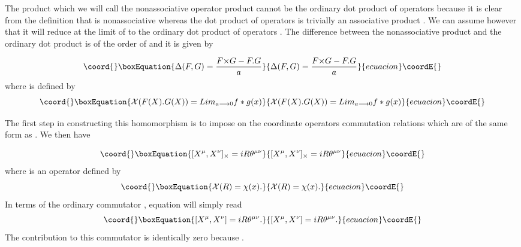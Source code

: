 \documentclass[a4paper,12pt]{article}
\begin{document}
The product \myHighlight{${\times}$}\coordHE{} which we will call the nonassociative
operator product cannot be the ordinary dot product of operators
because it is clear from the definition \coordHE{} that \myHighlight{$\times$}\coordHE{} is
nonassociative whereas the dot product of operators is trivially
an associative product . We can assume however that it will reduce
at the limit of \coordHE{} to the ordinary dot product
of operators . The difference \myHighlight{${\Delta}$}\coordHE{} between the
nonassociative product \myHighlight{${\times}$}\coordHE{} and the ordinary dot product is
of the order of \coordHE{} and it is given by

\begin{equation}\coord{}\boxEquation{
{\Delta}(F,G)=\frac{F{\times}G - F.G}{a}
}{
{\Delta}(F,G)=\frac{F{\times}G - F.G}{a}
}{ecuacion}\coordE{}\end{equation}
where \coordHE{} is defined by
\begin{equation}\coord{}\boxEquation{
{\cal X}(F(X).G(X))=Lim_{a{\longrightarrow}0}f*g(x)
}{
{\cal X}(F(X).G(X))=Lim_{a{\longrightarrow}0}f*g(x)
}{ecuacion}\coordE{}\end{equation}

The first step in constructing this homomorphism \coordHE{} is to
impose on the coordinate operators \coordHE{} commutation
relations which are of the same form as \coordHE{}  . We then have

\begin{equation}\coord{}\boxEquation{
[X^{\mu},X^{\nu}]_{\times}=iR{\theta}^{{\mu}{\nu}}
}{
[X^{\mu},X^{\nu}]_{\times}=iR{\theta}^{{\mu}{\nu}}
}{ecuacion}\coordE{}\end{equation}
where \coordHE{} is an operator defined by
\begin{equation}\coord{}\boxEquation{
{\cal X}(R)=\chi(x).
}{
{\cal X}(R)=\chi(x).
}{ecuacion}\coordE{}\end{equation}
In terms of the ordinary commutator , equation \coordHE{} will
simply read
\begin{equation}\coord{}\boxEquation{
[X^{\mu},X^{\nu}]=iR{\theta}^{{\mu}{\nu}}.
}{
[X^{\mu},X^{\nu}]=iR{\theta}^{{\mu}{\nu}}.
}{ecuacion}\coordE{}\end{equation}
The contribution
\coordHE{} to this
commutator is identically zero because
\coordHE{} .
\end{document}
